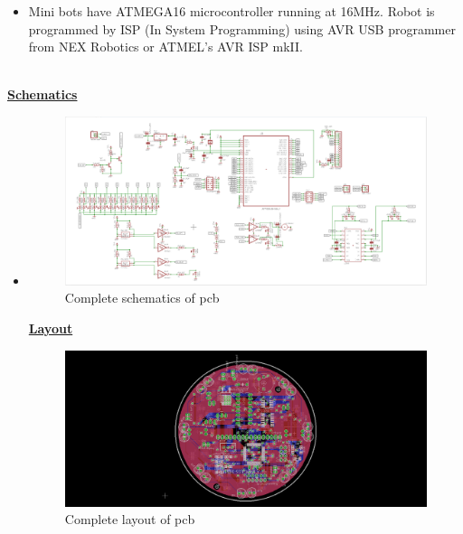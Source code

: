 \documentclass[a4paper,12pt,oneside]{book}
\begin{document}
	\begin{itemize}
	\item{Mini bots have ATMEGA16 microcontroller running at 16MHz. Robot is programmed by ISP (In System Programming) using AVR USB programmer from NEX
		Robotics or ATMEL’s AVR ISP mkII.}
	\end{itemize}
	\newpage
	\hfill\\
	\underline{\textbf{\Large{Schematics}}}
	\begin{itemize}
		\item {}
	\begin{figure}[h!]
		\caption{Complete schematics of pcb}
		\includegraphics[width=\textwidth]{./HardwareManual/capture.png}
	\end{figure}	
	
	\underline{\textbf{\Large{Layout}}}

	\begin{figure}[h!]
		\caption{Complete layout of pcb}
		\includegraphics[width=\textwidth]{./HardwareManual/capture1.png}
	\end{figure}		



\end{itemize}
\end{document}
